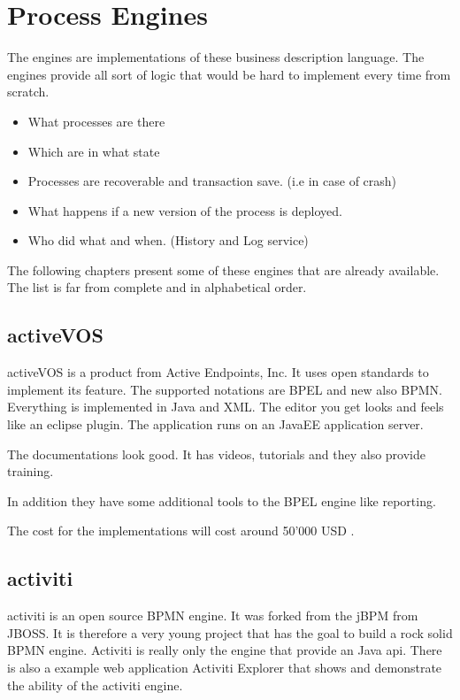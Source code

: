 \documentclass[paper=a4,twoside=false,BCOR=0mm,DIV=calc,fontsize=12pt]{scrartcl}
\begin{document}
\section{Process Engines}
The engines are implementations of these business description language. The engines provide all sort of logic that would be hard to implement every time from scratch.
\begin{itemize}
  \item What processes are there
  \item Which are in what state
  \item Processes are recoverable and transaction save. (i.e in case of crash)
  \item What happens if a new version of the process is deployed.
  \item Who did what and when. (History and Log service)
\end{itemize}

The following chapters present some of these engines that are already available. The list is far from complete and in alphabetical order.

\subsection{activeVOS}
activeVOS \cite{activevos} is a product from Active Endpoints, Inc. It uses open standards to implement its feature. The supported notations are BPEL and new also BPMN. Everything is implemented in Java and XML. The editor you get looks and feels like an eclipse plugin. The application runs on an JavaEE application server.

The documentations look good. It has videos, tutorials and they also provide training. 

In addition they have some additional tools to the BPEL engine like reporting.

The cost for the implementations will cost around 50'000 USD \cite{activvosscost}.


\subsection{activiti}
activiti \cite{activiti} is an open source BPMN engine. It was forked from the jBPM \cite{jbpm} from JBOSS. It is therefore a very young project that has the goal to build a rock solid BPMN engine. Activiti is really only the engine that provide an Java api. There is also a example web application Activiti Explorer that shows and demonstrate the ability of the activiti engine.
\end{document}
